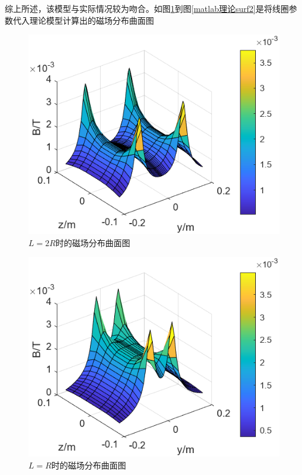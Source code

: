 \documentclass{ctexart}
\begin{document}
\begin{multicols}{2}
综上所述，该模型与实际情况较为吻合。如图\ref{matlab理论surf}到图\ref{matlab理论surf2}是将线圈参数代入理论模型计算出的磁场分布曲面图
\begin{figure}[H]
    \centering
    \includegraphics[scale=1]{./pic/matlab2R.png}       
    \caption{$L=2R$时的磁场分布曲面图} 
    \label{matlab理论surf}
\end{figure}
\begin{figure}[H]
    \centering
    \includegraphics[scale=1]{./pic/matlabR.png}
    \caption{$L=R$时的磁场分布曲面图} 
\end{figure}
\begin{figure}[H]
    \centering

\end{figure}
\end{multicols}
\end{document}

